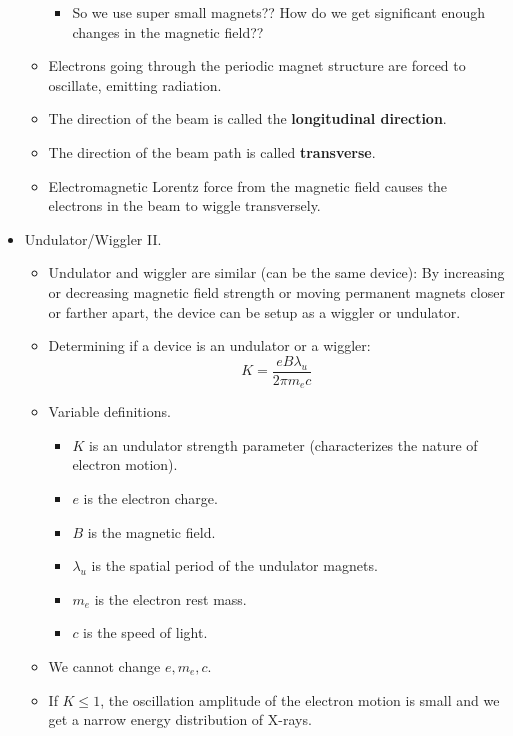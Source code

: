 \documentclass[../notes.tex]{subfiles}
\begin{document}
\begin{itemize}
\begin{itemize}
        \begin{itemize}
            \item So we use super small magnets?? How do we get significant enough changes in the magnetic field??
        \end{itemize}
        \item Electrons going through the periodic magnet structure are forced to oscillate, emitting radiation.
        \item The direction of the beam is called the \textbf{longitudinal direction}.
        \item The direction of the beam path is called \textbf{transverse}.
        \item Electromagnetic Lorentz force from the magnetic field causes the electrons in the beam to wiggle transversely.
    \end{itemize}
    \item Undulator/Wiggler II.
    \begin{itemize}
        \item Undulator and wiggler are similar (can be the same device): By increasing or decreasing magnetic field strength or moving permanent magnets closer or farther apart, the device can be setup as a wiggler or undulator.
        \item Determining if a device is an undulator or a wiggler:
        \begin{equation*}
            K = \frac{eB\lambda_u}{2\pi m_ec}
        \end{equation*}
        \item Variable definitions.
        \begin{itemize}
            \item $K$ is an undulator strength parameter (characterizes the nature of electron motion).
            \item $e$ is the electron charge.
            \item $B$ is the magnetic field.
            \item $\lambda_u$ is the spatial period of the undulator magnets.
            \item $m_e$ is the electron rest mass.
            \item $c$ is the speed of light.
        \end{itemize}
        \item We cannot change $e,m_e,c$.
        \item If $K\leq 1$, the oscillation amplitude of the electron motion is small and we get a narrow energy distribution of X-rays.

\end{itemize}
\end{itemize}
\end{document}
